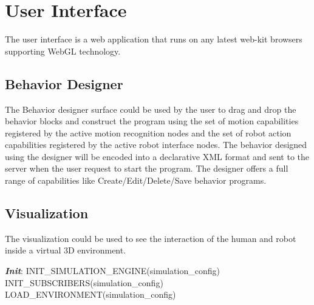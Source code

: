 \section{User Interface}
\label{ssec:ui_comp}
The user interface is a web application that runs on any latest web-kit browsers supporting WebGL technology. 

\subsection{Behavior Designer} The Behavior designer surface could be used by the user to drag and drop the behavior blocks and construct the program using the set of motion capabilities registered by the active motion recognition nodes and the set of robot action capabilities registered by the active robot interface nodes. The behavior designed using the designer will be encoded into a declarative XML format and sent to the server when the user request to start the program. The designer offers a full range of capabilities like Create/Edit/Delete/Save behavior programs.
\subsection{Visualization} The visualization could be used to see the interaction of the human and robot inside a virtual 3D environment.
\begin{algorithm}
 \textbf{\emph{Init}}:\;
 \quad INIT\_SIMULATION\_ENGINE(simulation\_config) \;
 \quad INIT\_SUBSCRIBERS(simulation\_config) \;
 \quad LOAD\_ENVIRONMENT(simulation\_config) \; 
\end{algorithm}


